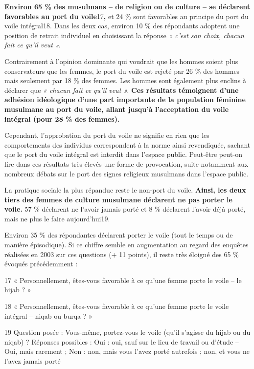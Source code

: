 \textbf{Environ 65 \% des musulmans -- de religion ou de culture -- se
déclarent favorables au port du voile}17\textbf{,} et 24 \% sont
favorables au principe du port du voile intégral18. Dans les deux cas,
environ 10 \% des répondants adoptent une position de retrait individuel
en choisissant la réponse \emph{« c'est son choix, chacun fait ce qu'il
veut ».}

Contrairement à l'opinion dominante qui voudrait que les hommes soient
plus conservateurs que les femmes, le port du voile est rejeté par 26 \%
des hommes mais seulement par 18 \% des femmes. Les hommes sont
également plus enclins à déclarer que \emph{« chacun fait ce qu'il veut
».} \textbf{Ces résultats témoignent d'une adhésion idéologique d'une
part importante de la population féminine musulmane au port du voile,
allant jusqu'à l'acceptation du voile intégral (pour 28 \% des femmes).}

Cependant, l'approbation du port du voile ne signifie en rien que les
comportements des individus correspondent à la norme ainsi revendiquée,
sachant que le port du voile intégral est interdit dans l'espace public.
Peut-être peut-on lire dans ces résultats très élevés une forme de
provocation, suite notamment aux nombreux débats sur le port des signes
religieux musulmans dans l'espace public.

La pratique sociale la plus répandue reste le non-port du voile.
\textbf{Ainsi, les deux tiers des femmes de culture musulmane déclarent
ne pas porter le voile.} 57 \% déclarent ne l'avoir jamais porté et 8 \%
déclarent l'avoir déjà porté, mais ne plus le faire aujourd'hui19.

Environ 35 \% des répondantes déclarent porter le voile (tout le temps
ou de manière épisodique). Si ce chiffre semble en augmentation au
regard des enquêtes réalisées en 2003 sur ces questions (+ 11 points),
il reste très éloigné des 65 \% évoqués précédemment :

17 « Personnellement, êtes-vous favorable à ce qu'une femme porte le
voile -- le hijab ? »

18 « Personnellement, êtes-vous favorable à ce qu'une femme porte le
voile intégral -- niqab ou burqa ? »

19 Question posée : Vous-même, portez-vous le voile (qu'il s'agisse du
hijab ou du niqab) ? Réponses possibles : Oui : oui, sauf sur le lieu de
travail ou d'étude -- Oui, mais rarement ; Non : non, mais vous l'avez
porté autrefois ; non, et vous ne l'avez jamais porté




